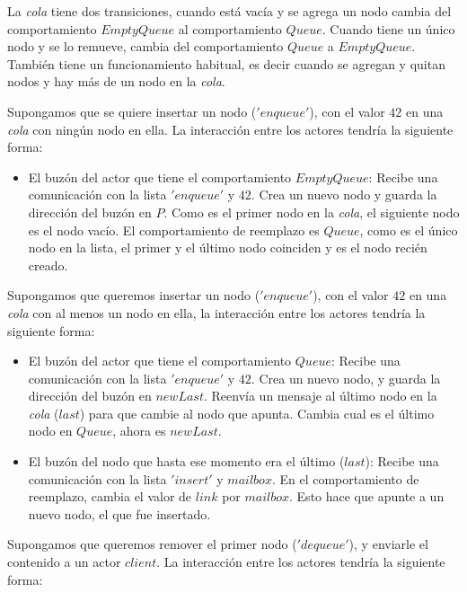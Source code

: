 La \textit{cola} tiene dos transiciones, cuando está vacía y se agrega un nodo cambia del comportamiento $EmptyQueue$ al comportamiento $Queue$. Cuando tiene un único nodo y se lo remueve, cambia del comportamiento $Queue$ a $EmptyQueue$. También tiene un funcionamiento habitual, es decir cuando se agregan y quitan nodos y hay más de un nodo en la \textit{cola}.

Supongamos que se quiere insertar un nodo ($'enqueue'$), con el valor $42$ en una \textit{cola} con ningún nodo en ella. La interacción entre los actores tendría la siguiente forma:

\begin{itemize}
 \item El buzón del actor que tiene el comportamiento $EmptyQueue$:
 \subitem Recibe una comunicación con la lista $'enqueue'$ y $42$.
 \subitem Crea un nuevo nodo y guarda la dirección del buzón en $P$.
 \subitem Como es el primer nodo en la \textit{cola}, el siguiente nodo es el nodo vacío.
 \subitem El comportamiento de reemplazo es $Queue$, como es el único nodo en la lista, el primer y el último nodo coinciden y es el nodo recién creado.
\end{itemize}

Supongamos que queremos insertar un nodo ($'enqueue'$), con el valor $42$ en una \textit{cola} con al menos un nodo en ella, la interacción entre los actores tendría la siguiente forma:

\begin{itemize}
 \item El buzón del actor que tiene el comportamiento $Queue$:
 \subitem Recibe una comunicación con la lista $'enqueue'$ y $42$.
 \subitem Crea un nuevo nodo, y guarda la dirección del buzón en $newLast$.
 \subitem Reenvía un mensaje al último nodo en la \textit{cola} ($last$) para que cambie al nodo que apunta.
 \subitem Cambia cual es el último nodo en $Queue$, ahora es $newLast$.
 \item El buzón del nodo que hasta ese momento era el último ($last$):
 \subitem Recibe una comunicación con la lista $'insert'$ y $mailbox$.
 \subitem En el comportamiento de reemplazo, cambia el valor de $link$ por $mailbox$. Esto hace que apunte a un nuevo nodo, el que fue insertado.
\end{itemize}

Supongamos que queremos remover el primer nodo ($'dequeue'$), y enviarle el contenido a un actor $client$. La interacción entre los actores tendría la siguiente forma:


